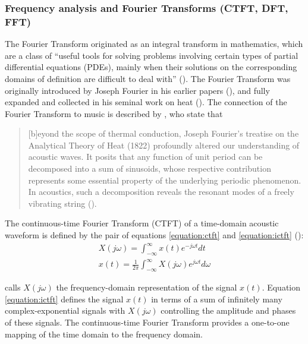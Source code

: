 \documentclass[report.tex]{subfiles}
\begin{document}
\subsubsection{Frequency analysis and Fourier Transforms (CTFT, DFT, FFT)}
\label{sec:freqanal}

The Fourier Transform originated as an integral transform in mathematics, which are a class of ``useful tools for solving problems involving certain types of partial differential equations (PDEs), mainly when their solutions on the corresponding domains of definition are difficult to deal with'' (\cite[54]{fourierhistory}). The Fourier Transform was originally introduced by Joseph Fourier in his earlier papers (\cite{fourierhist1, fourierhist2}), and fully expanded and collected in his seminal work on heat (\cite{fourierheat}). The connection of the Fourier Transform to music is described by \citeauthor{fouriermusic}, who state that

\begin{quote}
	[b]eyond the scope of thermal conduction, Joseph Fourier's treatise on the Analytical Theory of Heat (1822) profoundly altered our understanding of acoustic waves. It posits that any function of unit period can be decomposed into a sum of sinusoids, whose respective contribution represents some essential property of the underlying periodic phenomenon. In acoustics, such a decomposition reveals the resonant modes of a freely vibrating string (\cite[461]{fouriermusic}).
\end{quote}

The continuous-time Fourier Transform (CTFT) of a time-domain acoustic waveform is defined by the pair of equations \eqref{equation:ctft} and \eqref{equation:ictft} (\cite[308]{dspfirst}):
\begin{align}
	X(j\omega) = \int_{-\infty}^{\infty}{x(t)e^{-j\omega t}\mathit{dt}} \tag{1}\label{equation:ctft} \\
	x(t) = \frac{1}{2\pi}\int_{-\infty}^{\infty}{X(j\omega)e^{j\omega t}\mathit{d\omega}} \tag{2}\label{equation:ictft}
\end{align}

\textcite{dspfirst} calls $X(j\omega)$ the frequency-domain representation of the signal $x(t)$. Equation \eqref{equation:ictft} defines the signal $x(t)$ in terms of a sum of infinitely many complex-exponential signals with $X(j\omega)$ controlling the amplitude and phases of these signals. The continuous-time Fourier Transform provides a one-to-one mapping of the time domain to the frequency domain.
\end{document}
